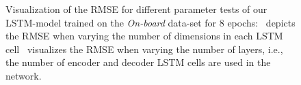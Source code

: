 \begin{figure}[t!]
	\centering
    \vspace{-0.3cm}
    \caption{Visualization of the \ac{RMSE} for different parameter tests of our \ac{LSTM}-model trained on the \emph{On-board} data-set for \num{8} epochs:~\protect{} depicts the \ac{RMSE} when varying the number of dimensions in each \ac{LSTM} cell~\protect{} visualizes the \ac{RMSE} when varying the number of layers, i.e., the number of encoder and decoder \ac{LSTM} cells are used in the network.}
    \label{fig:lstm_units_layers_analysis}
\end{figure}

